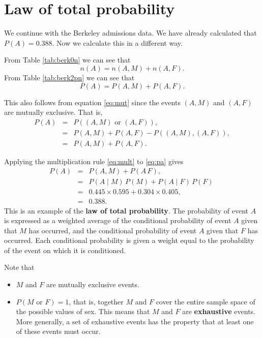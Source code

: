 \documentclass[
  british,
  11pt,
  openany, a4paper]{book}
\providecommand{\tightlist}{%
  \setlength{\itemsep}{0pt}\setlength{\parskip}{0pt}}
\begin{document}
\section{Law of total probability}\label{law-of-total-probability}

We continue with the Berkeley admissions data. We have already calculated that \(P(A)=0.388\). Now we calculate this in a different way.

From Table \ref{tab:berk0n} we can see that
\[ n(A) = n(A , M) + n(A , F). \]
From Table \ref{tab:berk2pn} we can see that
\begin{equation}
P(A) = P(A , M) + P(A , F). 
\label{eq:pa}
\end{equation}

This also follows from equation \eqref{eq:mut} since the events \((A , M)\) and \((A , F)\) are mutually exclusive. That is,
\begin{eqnarray*}
 P(A) &=& P((A , M) \text{ or } (A , F) ), \\
 &=& P(A , M) + P(A , F) - P((A , M) , (A , F)), \\
 &=& P(A , M) + P(A , F). 
\end{eqnarray*}

Applying the multiplication rule \eqref{eq:mult} to \eqref{eq:pa} gives
\begin{eqnarray*}
P(A) &=& P(A , M) + P(A \, F), \\
     &=& P(A \mid M)\,P(M) + P(A \mid F)\,P(F)\ \\
     &=& 0.445 \times 0.595 + 0.304 \times 0.405, \\
     &=& 0.388.
\end{eqnarray*}
This is an example of the \textbf{law of total probability}. The probability of event \(A\) is expressed as a weighted average of the conditional probability of event \(A\) given that \(M\) has occurred, and the conditional probability of event \(A\) given that \(F\) has occurred. Each conditional probability is given a weight equal to the probability of the event on which it is conditioned.

Note that

\begin{itemize}
\tightlist
\item
  \(M\) and \(F\) are mutually exclusive events.
\item
  \(P(M \text{ or } F) = 1\), that is, together \(M\) and \(F\) cover the entire sample space of the possible values of sex. This means that \(M\) and \(F\) are \textbf{exhaustive} events. More generally, a set of exhaustive events has the property that at least one of these events must occur.
\end{itemize}
\end{document}
